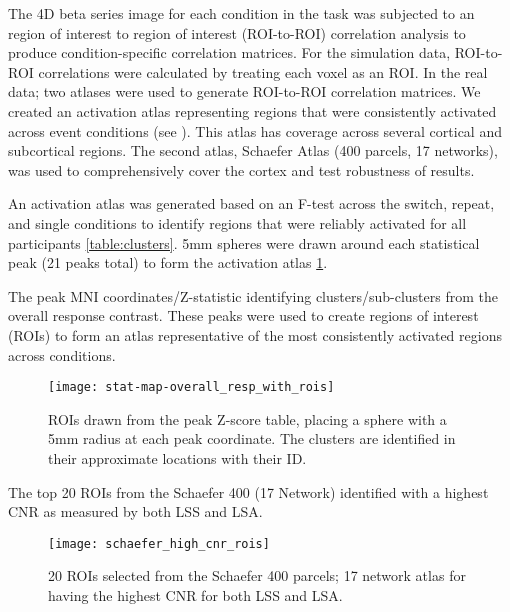\documentclass[10pt,letterpaper]{article}
\begin{document}
The 4D beta series image for each condition in the task was subjected to
an region of interest to region of interest (ROI-to-ROI) correlation analysis
to produce condition-specific correlation matrices.
For the simulation data, ROI-to-ROI correlations were calculated by
treating each voxel as an ROI.
In the real data; two atlases were used to generate ROI-to-ROI correlation matrices.
We created an activation atlas representing regions that were
consistently activated across event conditions (see ).
This atlas has coverage across several cortical and subcortical regions.
The second atlas, Schaefer Atlas (400 parcels, 17 networks)\cite{Schaefer2017}, was
used to comprehensively cover the cortex and test robustness of results.

An activation atlas was generated based on an F-test across the switch, repeat, and single conditions
to identify regions that were reliably activated for all participants \ref{table:clusters}.
5mm spheres were drawn around each statistical peak (21 peaks total)
to form the activation atlas \ref{fig:methroimap}.

\begin{table}[H]
  \caption{
    The peak MNI coordinates/Z-statistic identifying clusters/sub-clusters from the overall
    response contrast.
    These peaks were used to create regions of interest (ROIs) to form an atlas representative
    of the most consistently activated regions across conditions.
  }
  \label{table:clusters}
\end{table}

\begin{figure}[H]
  \centering
  \texttt{[image: stat-map-overall\_resp\_with\_rois]}
  \caption{
    ROIs drawn from the peak Z-score table, placing a sphere with a 5mm radius
    at each peak coordinate.
    The clusters are identified in their approximate locations
    with their ID.
  }
  \label{fig:methroimap}
\end{figure}

\begin{table}[H]
  \caption{
    The top 20 ROIs from the Schaefer 400 (17 Network) identified with a highest CNR as measured by
    both LSS and LSA.
  }
  \label{table:parcels}
\end{table}

\begin{figure}[H]
  \centering
  \texttt{[image: schaefer\_high\_cnr\_rois]}
  \caption{
    20 ROIs selected from the Schaefer 400 parcels; 17 network atlas for having the
    highest CNR for both LSS and LSA.
  }
  \label{fig:schaefertopmap}
\end{figure}
\end{document}
